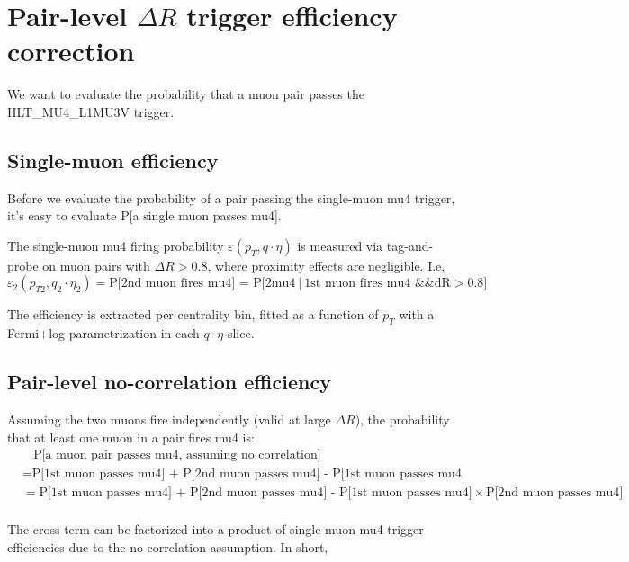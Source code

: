 \documentclass[11pt]{article}
\begin{document}
\section*{Pair-level $\Delta R$ trigger efficiency correction}
We want to evaluate the probability that a muon pair passes the HLT\_MU4\_L1MU3V trigger. 

\subsection*{Single-muon efficiency}

Before we evaluate the probability of a pair passing the single-muon mu4 trigger, it's easy to evaluate P[a single muon passes mu4].

The single-muon mu4 firing probability $\varepsilon(p_T, q\!\cdot\!\eta)$ is measured via tag-and-probe on muon pairs with $\Delta R > 0.8$, where proximity effects are negligible. I.e, 
\begin{equation}
    \varepsilon_2 (p_{T2}, q_2 \cdot \eta_2) = \textrm{P[2nd muon fires mu4] = P[2mu4}\ |\ \textrm{1st muon fires mu4 \&\& dR} > 0.8]
\end{equation}

The efficiency is extracted per centrality bin, fitted as a function of $p_T$ with a Fermi$+$log parametrization in each $q\!\cdot\!\eta$ slice.

\subsection*{Pair-level no-correlation efficiency}

Assuming the two muons fire independently (valid at large $\Delta R$), the probability that at least one muon in a pair fires mu4 is:
\begin{equation}
    \begin{split}
        &\ \ \ \ \textrm{P[a muon pair passes mu4, assuming no correlation]} \\
        &= \textrm{P[1st muon passes mu4] + P[2nd muon passes mu4] - P[1st muon passes mu4 \&\& 2nd muon passes mu4]}\\
        &= \textrm{P[1st muon passes mu4] + P[2nd muon passes mu4] - P[1st muon passes mu4]} \times \textrm{P[2nd muon passes mu4]}\\
    \end{split}
\end{equation}

The cross term can be factorized into a product of single-muon mu4 trigger efficiencies due to the no-correlation assumption. In short,
\end{document}
